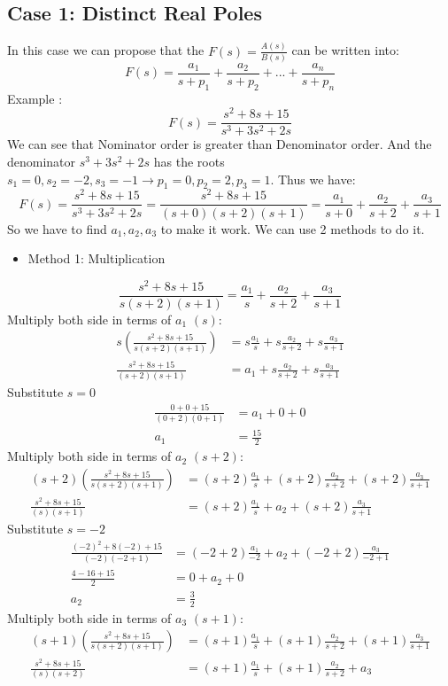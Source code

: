 \documentclass[12pt,a4paper]{article}
\begin{document}
	\subsection{Case 1: Distinct Real Poles}
	In this case we can propose that the \(F(s) = \frac{A(s)}{B(s)}\) can be written into:
	\[
	F(s) = \frac{a_1}{s+p_1} + \frac{a_2}{s+p_2} + ... + \frac{a_n}{s+p_n}
	\]
	Example :
	\[
	F(s) = \frac{s^2+8s+15}{s^3+3s^2+2s}
	\]
	We can see that Nominator order is greater than Denominator order. And the denominator \(s^3+3s^2+2s\) has the roots \(s_1=0 , s_2=-2 , s_3=-1 \rightarrow p_1=0, p_2=2, p_3=1\). Thus we have:
	\[
	F(s) = \frac{s^2+8s+15}{s^3+3s^2+2s} = \frac{s^2+8s+15}{(s+0)(s+2)(s+1)} = \frac{a_1}{s+0} + \frac{a_2}{s+2} + \frac{a_3}{s+1} 
	\]
	So we have to find \(a_1,a_2,a_3\) to make it work. We can use 2 methods to do it.
	\begin{itemize}
		\item Method 1: Multiplication
	\end{itemize}
	\[
	\frac{s^2+8s+15}{s(s+2)(s+1)} = \frac{a_1}{s} + \frac{a_2}{s+2} + \frac{a_3}{s+1} 
	\]
	Multiply both side in terms of \(a_1\) \((s)\):
	\[
	\begin{split}
		s(\frac{s^2+8s+15}{s(s+2)(s+1)}) &= s\frac{a_1}{s} + s\frac{a_2}{s+2} + s\frac{a_3}{s+1} \\
		\frac{s^2+8s+15}{(s+2)(s+1)} &= a_1 + s\frac{a_2}{s+2} + s\frac{a_3}{s+1}
	\end{split}
	\]
	Substitute \(s=0\)
	\[
	\begin{split}
		\frac{0+0+15}{(0+2)(0+1)} &= a_1 + 0 + 0 \\
		a_1 &= \frac{15}{2}
	\end{split}
	\]
	Multiply both side in terms of \(a_2\) \((s+2)\):
	\[
	\begin{split}
		(s+2)(\frac{s^2+8s+15}{s(s+2)(s+1)}) &= (s+2)\frac{a_1}{s} + (s+2)\frac{a_2}{s+2} + (s+2)\frac{a_3}{s+1} \\
		\frac{s^2+8s+15}{(s)(s+1)} &= (s+2)\frac{a_1}{s} + a_2 + (s+2)\frac{a_3}{s+1}
	\end{split}
	\]
	Substitute \(s=-2\)
	\[
	\begin{split}
		\frac{(-2)^2+8(-2)+15}{(-2)(-2+1)} &= (-2+2)\frac{a_1}{-2} + a_2 + (-2+2)\frac{a_3}{-2+1} \\
		\frac{4-16+15}{2} &= 0 + a_2 + 0 \\
		a_2 &= \frac{3}{2}
	\end{split}
	\]
	Multiply both side in terms of \(a_3\) \((s+1)\):
	\[
	\begin{split}
		(s+1)(\frac{s^2+8s+15}{s(s+2)(s+1)}) &= (s+1)\frac{a_1}{s} + (s+1)\frac{a_2}{s+2} + (s+1)\frac{a_3}{s+1} \\
		\frac{s^2+8s+15}{(s)(s+2)} &= (s+1)\frac{a_1}{s} + (s+1)\frac{a_2}{s+2} + a_3 \\
	\end{split}
	\]
\end{document}
